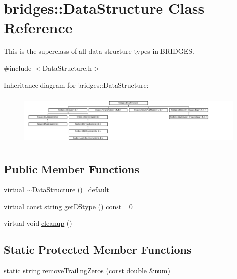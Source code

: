 \hypertarget{classbridges_1_1_data_structure}{}\section{bridges\+:\+:Data\+Structure Class Reference}
\label{classbridges_1_1_data_structure}


This is the superclass of all data structure types in B\+R\+I\+D\+G\+E\+S.  




{\ttfamily \#include $<$Data\+Structure.\+h$>$}

Inheritance diagram for bridges\+:\+:Data\+Structure\+:\begin{figure}[H]
\begin{center}
\leavevmode
\includegraphics[height=2.594595cm]{classbridges_1_1_data_structure}
\end{center}
\end{figure}
\subsection*{Public Member Functions}
\begin{DoxyCompactItemize}
\item 
virtual \hyperlink{classbridges_1_1_data_structure_afd70a1ae5c2578d80a441714f95f9401}{$\sim$\+Data\+Structure} ()=default
\item 
virtual const string \hyperlink{classbridges_1_1_data_structure_ab6973cdb2a22b7e664b895f1f9c8ad54}{get\+D\+Stype} () const  =0
\item 
virtual void \hyperlink{classbridges_1_1_data_structure_ac3ad75810fd77f0ad35b9b5123d2c8f8}{cleanup} ()
\end{DoxyCompactItemize}
\subsection*{Static Protected Member Functions}
\begin{DoxyCompactItemize}
\item 
static string \hyperlink{classbridges_1_1_data_structure_a2dfc9d9b970680e2b19f7196cf36783a}{remove\+Trailing\+Zeros} (const double \&num)
\end{DoxyCompactItemize}
